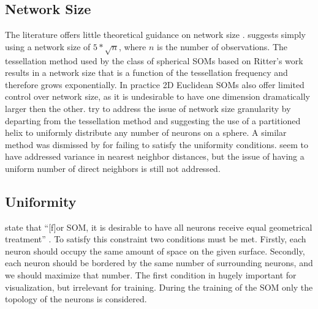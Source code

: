 \documentclass[11pt]{article}
\begin{document}
\subsection{Network Size}
The literature offers little theoretical guidance on network size
\citep{cho1996}.  \cite{toolbox} suggests simply using a network size of
\(5*\sqrt {n}\), where \(n\) is the number of observations.  The tessellation
method used by the class of spherical SOMs based on Ritter's work results in a
network size that is a function of the tessellation frequency and therefore
grows exponentially. In practice 2D Euclidean SOMs also offer limited control
over network size, as it is undesirable to have one dimension dramatically
larger then the other.  \cite{Nishio:2006fk} try to address the issue of network
size granularity by departing from the tessellation method and suggesting the
use of a partitioned helix to uniformly distribute any number of neurons on a
sphere.  A similar method was dismissed by \cite{wu2005} for failing to satisfy
the uniformity conditions.  \citeauthor{Nishio:2006fk} seem to have addressed
variance in nearest neighbor distances, but the issue of having a uniform number
of direct neighbors is still not addressed.

\subsection{Uniformity}
\citeauthor{wu2006} state that ``[f]or SOM, it is desirable to have all neurons
receive equal geometrical treatment'' \cite[pp. 900]{wu2006}.  To satisfy this
constraint two conditions must be met.  Firstly, each neuron should occupy the
same amount of space on the given surface.  Secondly, each neuron should be
bordered by the same number of surrounding neurons, and we should maximize 
that number.  The first condition in hugely important for visualization, but 
irrelevant for training.  During the training of the SOM only the topology of the 
neurons is considered.
\end{document}
